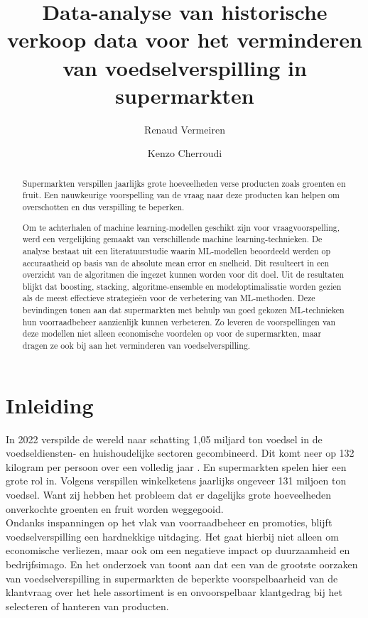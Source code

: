 \documentclass{hogent-article}
\title{Data-analyse van historische verkoop data voor het verminderen van voedselverspilling in supermarkten}
\author{Renaud Vermeiren}
\author{Kenzo Cherroudi}
\begin{document}
    
\begin{abstract}
  
Supermarkten verspillen jaarlijks grote hoeveelheden verse producten zoals groenten en fruit. Een nauwkeurige voorspelling van de vraag naar deze producten kan helpen om overschotten en dus verspilling te beperken.
        
        
        
 Om te achterhalen of machine learning-modellen geschikt zijn voor vraagvoorspelling, werd een vergelijking gemaakt van verschillende machine learning-technieken. De analyse bestaat uit een literatuurstudie waarin ML-modellen beoordeeld werden op accuraatheid op basis van de absolute mean error en snelheid. Dit resulteert in een overzicht van de algoritmen die ingezet kunnen worden voor dit doel. Uit de resultaten blijkt dat boosting, stacking, algoritme-ensemble en modeloptimalisatie worden gezien als de meest effectieve strategieën voor de verbetering van ML-methoden.
 Deze bevindingen tonen aan dat supermarkten met behulp van goed gekozen ML-technieken hun voorraadbeheer aanzienlijk kunnen
 verbeteren. Zo leveren de voorspellingen van deze modellen niet alleen economische voordelen op voor de supermarkten, maar
 dragen ze ook bij aan het verminderen van voedselverspilling.
        
    \end{abstract}
    
    \tableofcontents
    
    \bigskip
    
    \section{Inleiding}%
    
    \label{sec:inleiding}
    
   In 2022 verspilde de wereld naar schatting 1,05 miljard ton voedsel in de voedseldiensten- en huishoudelijke sectoren gecombineerd. Dit komt neer op 132 kilogram per persoon over een volledig jaar \autocite{Programme202403}. En supermarkten spelen hier een grote rol in. Volgens \textcite{Programme202403} verspillen winkelketens jaarlijks ongeveer 131 miljoen ton voedsel. Want zij hebben het probleem dat er dagelijks grote hoeveelheden onverkochte groenten en fruit worden weggegooid.\\
   
   Ondanks inspanningen op het vlak van voorraadbeheer en promoties, blijft voedselverspilling een hardnekkige uitdaging. Het gaat hierbij niet alleen om economische verliezen, maar ook om een negatieve impact op duurzaamheid en bedrijfsimago. En het onderzoek van \textcite{Teller2018a} toont aan dat een van de grootste oorzaken van voedselverspilling in supermarkten de beperkte voorspelbaarheid van de klantvraag over het hele assortiment is en onvoorspelbaar klantgedrag bij het selecteren of hanteren van producten.\\
   
\end{document}
